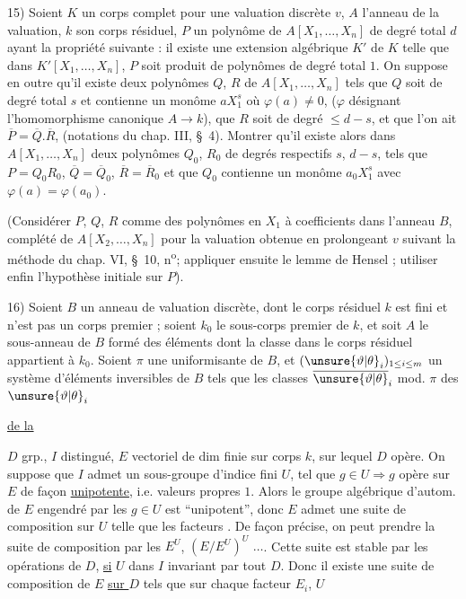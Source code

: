 15) Soient $K$ un corps complet pour une valuation discrète $v$, $A$ l'anneau de la valuation, $k$ son corps résiduel, $P$ un polynôme de $A[X_1,\ldots,X_n]$ de degré total $d$ ayant la propriété suivante : il existe une extension algébrique $K'$ de $K$ telle que dans $K'[X_1,\ldots,X_n]$, $P$ soit produit de polynômes de degré total $1$. On suppose en outre qu'il existe deux polynômes $Q$, $R$ de $A[X_1,\ldots,X_n]$ tels que $Q$ soit de degré total $s$ et contienne un monôme $aX_1^s$ où $\varphi(a)\ne 0$, ($\varphi$ désignant l'homomorphisme canonique $A\longrightarrow k$), que $R$ soit de degré $\leq d-s$, et que l'on ait $\overline{P}=\overline{Q}.\overline{R}$, (notations du chap. III, \S\ 4). Montrer qu'il existe alors dans $A[X_1,\ldots,X_n]$ deux polynômes $Q_0$, $R_0$ de degrés respectifs $s$, $d-s$, tels que $P=Q_0R_0$, $\overline{Q}=\overline{Q}_0$, $\overline{R}=\overline{R}_0$ et que $Q_0$ contienne un monôme $a_0X_1^s$ avec $\varphi(a)=\varphi(a_0)$.

(Considérer $P$, $Q$, $R$ comme des polynômes en $X_1$ à coefficients dans l'anneau $B$, complété de $A[X_2,\ldots,X_n]$ pour la valuation obtenue en prolongeant $v$ suivant la méthode du chap. VI, \S\ 10, n\textsuperscript{o}\quad ; appliquer ensuite le lemme de Hensel ; utiliser enfin l'hypothèse initiale sur $P$).

16) Soient $B$ un anneau de valuation discrète, dont le corps résiduel $k$ est fini et n'est pas un corps premier ; soient $k_0$ le sous-corps premier de $k$, et soit $A$ le sous-anneau de $B$ formé des éléments dont la classe dans le corps résiduel appartient à $k_0$. Soient $\pi$ une uniformisante de $B$, et $(\unsure{\vartheta|\theta}_i)_{1\leq i\leq m}$ un système d'éléments inversibles de $B$ tels que les classes $\overline{\unsure{\vartheta|\theta}}_i$ mod. $\pi$ des $\unsure{\vartheta|\theta}_i$



\uline{ de la }

$D$ grp., $I$  distingué, $E$ vectoriel de dim finie sur corps $k$, sur lequel $D$ opère. On suppose que $I$ admet un sous-groupe d'indice fini $U$,  tel que $g\in U\Rightarrow g$ opère sur $E$ de façon \uline{unipotente}, i.e. valeurs propres  $1$. Alors le groupe algébrique d'autom. de $E$ engendré par les $g\in U$ est ``unipotent'', donc  $E$ admet une suite de composition sur $U$ telle que les  facteurs . De façon précise, on peut prendre la suite de composition par les $E^U$, $(E/E^U)^U$ $\ldots$. Cette suite est stable par les opérations de $D$, \uline{si}    $U$ dans $I$ invariant par tout $D$. Donc il existe une suite de composition de $E$ \uline{sur $D$} tels que sur chaque facteur $E_i$,  $U$

